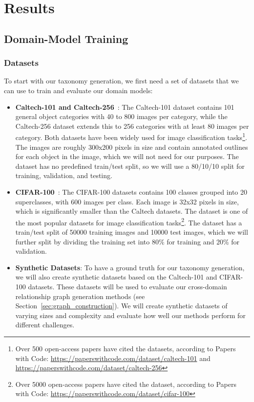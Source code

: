 \chapter{Results}

\section{Domain-Model Training}

\subsection{Datasets}

To start with our taxonomy generation,
we first need a set of datasets that we can use to train and evaluate our domain models:

\begin{itemize}
    \item \textbf{Caltech-101 and Caltech-256}~\cite{li_caltech_2022,griffin_caltech_2022}:
          The Caltech-101 dataset contains 101 general object categories with 40 to 800 images per category,
          while the Caltech-256 dataset extends this to 256 categories with at least 80 images per category.
          Both datasets have been widely used for image classification tasks\footnote{Over 500 open-access papers have cited the datasets, according to Papers with Code: \url{https://paperswithcode.com/dataset/caltech-101} and \url{https://paperswithcode.com/dataset/caltech-256}}.
          The images are roughly 300x200 pixels in size and contain annotated outlines
          for each object in the image, which we will not need for our purposes.
          The dataset has no predefined train/test split,
          so we will use a 80/10/10 split for training, validation, and testing.
    \item \textbf{CIFAR-100}~\cite{krizhevsky_learning_2009}:
          The CIFAR-100 datasets contains 100 classes grouped into 20 superclasses,
          with 600 images per class.
          Each image is 32x32 pixels in size, which is significantly smaller than the Caltech datasets.
          The dataset is one of the most popular datasets for image classification tasks\footnote{Over 5000 open-access papers have cited the dataset, according to Papers with Code: \url{https://paperswithcode.com/dataset/cifar-100}}.
          The dataset has a train/test split of 50000 training images and 10000 test images,
          which we will further split by dividing the training set into 80\% for training and 20\% for validation.
    \item \textbf{Synthetic Datasets}:
          To have a ground truth for our taxonomy generation,
          we will also create synthetic datasets based on the Caltech-101 and CIFAR-100 datasets.
          These datasets will be used to evaluate our cross-domain relationship graph generation
          methods (see Section~\ref{sec:graph_construction}).
          We will create synthetic datasets of varying sizes and complexity and evaluate
          how well our methods perform for different challenges.
\end{itemize}

